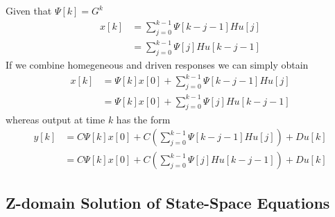 \documentclass[twoside]{article}
\begin{document}
%
Given that $\Psi[k] = G^k$
%
\begin{align*}
    x[k] &= \sum\limits_{j = 0}^{k-1} \Psi[k-j-1] H u[j]
\\
&= \sum\limits_{j = 0}^{k-1} \Psi[j] H u[k-j-1]
\end{align*}
%
If we combine homegeneous and driven responses we can simply obtain
%
\begin{align*}
    x[k] &= \Psi[k] x[0] + \sum\limits_{j = 0}^{k-1} \Psi[k-j-1] H u[j]
\\
&= \Psi[k] x[0] + \sum\limits_{j = 0}^{k-1} \Psi[j] H u[k-j-1]
\end{align*}
% 
whereas output at time $k$ has the form
%
\begin{align*}
    y[k] &= C \Psi[k] x[0] + C \left( \sum\limits_{j = 0}^{k-1}
           \Psi[k-j-1] H u[j] \right) + D u[k]
\\
&= C \Psi[k] x[0] + C \left( \sum\limits_{j = 0}^{k-1} \Psi[j] H
  u[k-j-1] \right) +  D u[k]
\end{align*}
% 

\subsection*{Z-domain Solution of State-Space Equations}
\end{document}
